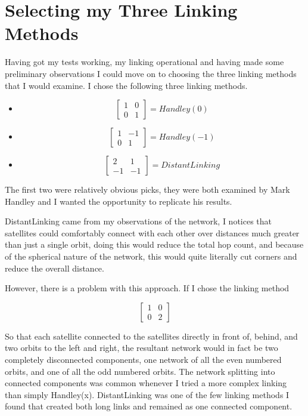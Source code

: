 \documentclass[12pt]{report}
\begin{document}

\section{Selecting my Three Linking Methods}

Having got my tests working, my linking operational and having made some preliminary observations I could move on to choosing the three linking methods that I would examine. I chose the following three linking methods.

\begin{itemize}
\item
\[\begin{bmatrix} 
1 & 0 \\
0 & 1 
\end{bmatrix} = Handley(0)\]
\item
\[\begin{bmatrix} 
1 & -1 \\
0 & 1 
\end{bmatrix} = Handley(-1)\]
\item
\[\begin{bmatrix} 
2 & 1 \\
-1 & -1 
\end{bmatrix} = DistantLinking\]
\end{itemize}

The first two were relatively obvious picks, they were both examined by Mark Handley and I wanted the opportunity to replicate his results.

DistantLinking came from my observations of the network, I notices that satellites could comfortably connect with each other over distances much greater than just a single orbit, doing this would reduce the total hop count, and because of the spherical nature of the network, this would quite literally cut corners and reduce the overall distance.

However, there is a problem with this approach. If I chose the linking method 

\[\begin{bmatrix} 
1 & 0 \\
0 & 2 
\end{bmatrix} \]

So that each satellite connected to the satellites directly in front of, behind, and two orbits to the left and right, the resultant network would in fact be two completely disconnected components, one network of all the even numbered orbits, and one of all the odd numbered orbits. The network splitting into connected components was common whenever I tried a more complex linking than simply Handley(x). DistantLinking was one of the few linking methods I found that created both long links and remained as one connected component.
\end{document}

